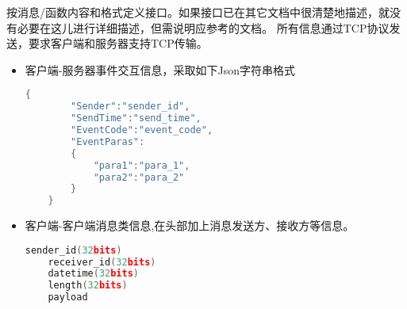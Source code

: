按消息/函数内容和格式定义接口。如果接口已在其它文档中很清楚地描述，就没有必要在这儿进行详细描述，但需说明应参考的文档。
\fi
所有信息通过TCP协议发送，要求客户端和服务器支持TCP传输。
\begin{itemize}
	\item 客户端-服务器事件交互信息，采取如下Json字符串格式
    \begin{lstlisting}[language=C++]
   	{
   		"Sender":"sender_id",
   		"SendTime":"send_time",
   		"EventCode":"event_code",
   		"EventParas":
   		{
   			"para1":"para_1",
   			"para2":"para_2"
   		}
   	}
    \end{lstlisting}
    \item 客户端-客户端消息类信息,在头部加上消息发送方、接收方等信息。
    \begin{lstlisting}[language=C++]
    sender_id(32bits)
    receiver_id(32bits)
    datetime(32bits)
    length(32bits)
    payload
    \end{lstlisting}
\end{itemize}
